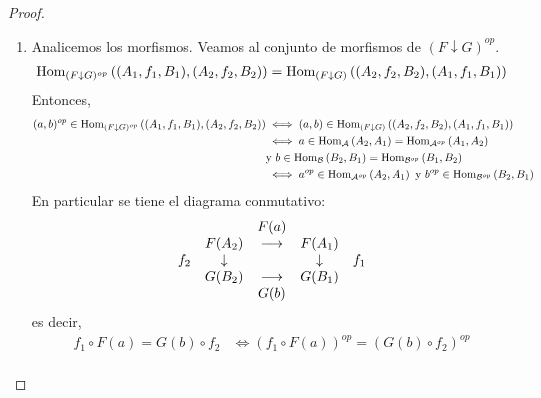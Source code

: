 \documentclass[12pt]{report}
\newcounter{it}
\theoremstyle{largebreak}
\newcommand{\Hom}[3]{\ensuremath{\textup{Hom}_{#1}\left(#2,#3\right)}}
\begin{document}
\begin{proof}
\begin{enumerate}
            \item Analicemos los morfismos. Veamos al conjunto de morfismos de $(F\downarrow G)^{op}$.
            \begin{equation*}
                \begin{split}
                    \Hom{(F\downarrow G)^{op}}{(A_1,f_1,B_1)}{(A_2,f_2,B_2)}&=\Hom{(F\downarrow G)}{(A_2,f_2,B_2)}{(A_1,f_1,B_1)}\\
                \end{split}
            \end{equation*}
            Entonces,
            \begin{equation*}
                \begin{split}
                    (a,b)^{op}\in\Hom{(F\downarrow G)^{op}}{(A_1,f_1,B_1)}{(A_2,f_2,B_2)}&\iff (a,b)\in\Hom{(F\downarrow G)}{(A_2,f_2,B_2)}{(A_1,f_1,B_1)}\\
                    &\iff a\in\Hom{\mathcal{A}}{A_2}{A_1}=\Hom{\mathcal{A}^{op}}{A_1}{A_2}\\
                    &\textup{y }b\in\Hom{\mathcal{B}}{B_2}{B_1}=\Hom{\mathcal{B}^{op}}{B_1}{B_2}\\
                    &\iff a^{op}\in\Hom{\mathcal{A}^{op}}{A_2}{A_1}\textup{ y }b^{op}\in\Hom{\mathcal{B}^{op}}{B_2}{B_1}\\
                \end{split}
            \end{equation*}
            En particular se tiene el diagrama conmutativo:
            \begin{equation*}
                \begin{array}[pos]{lcccr}
                    & & F(a) & & \\
                    & F(A_2) & \longrightarrow & F(A_1) & \\
                    f_2 & \downarrow & & \downarrow & f_1\\
                    & G(B_2) & \longrightarrow & G(B_1) & \\
                    & & G(b) & & \\
                \end{array}
            \end{equation*}
            es decir,
            \begin{equation*}
                \begin{split}
                    f_1\circ F(a)=G(b)\circ f_2&\iff (f_1\circ F(a))^{op}=(G(b)\circ f_2)^{op}\\

\end{split}
\end{equation*}
\end{enumerate}
\end{proof}
\end{document}
